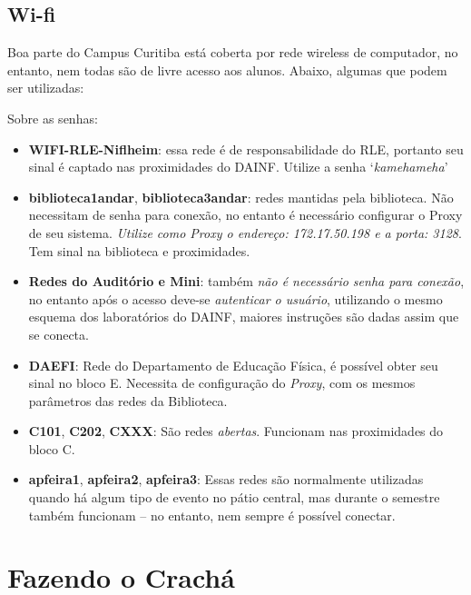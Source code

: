 \documentclass[a4paper,12pt,openany]{article}
\begin{document}
\subsection{Wi-fi}
Boa parte do Campus Curitiba está coberta por rede wireless de computador, no entanto, nem todas são de livre acesso aos alunos. Abaixo, algumas que podem ser utilizadas:

Sobre as senhas:
\begin{itemize}
\item \textbf{WIFI-RLE-Niflheim}: essa rede é de responsabilidade do RLE, portanto seu sinal é captado nas proximidades do DAINF. Utilize a senha ‘\textit{kamehameha}’

\item \textbf{biblioteca1andar}, \textbf{biblioteca3andar}: redes mantidas pela biblioteca. Não necessitam de senha para conexão, no entanto é necessário configurar o Proxy de seu sistema. \textit{Utilize como Proxy o endereço: 172.17.50.198 e a porta: 3128}. Tem sinal na biblioteca e proximidades. 

\item\textbf{Redes do Auditório e Mini}: também \textit{não é necessário senha para conexão}, no entanto após o acesso deve-se \textit{autenticar o usuário}, utilizando o mesmo esquema dos laboratórios do DAINF, maiores instruções são dadas assim que se conecta.

\item \textbf{DAEFI}: Rede do Departamento de Educação Física, é possível obter seu sinal no bloco E. Necessita de configuração do \textit{Proxy}, com os mesmos parâmetros das redes da Biblioteca.

\item \textbf{C101}, \textbf{C202}, \textbf{CXXX}:  São redes \textit{abertas}. Funcionam nas proximidades do bloco C.

\item \textbf{apfeira1}, \textbf{apfeira2}, \textbf{apfeira3}: Essas redes são normalmente utilizadas quando há algum tipo de evento no pátio central, mas durante o semestre também funcionam – no entanto, nem sempre é possível conectar.


\end{itemize}


\newpage
\section{Fazendo o Crachá}
\end{document}
